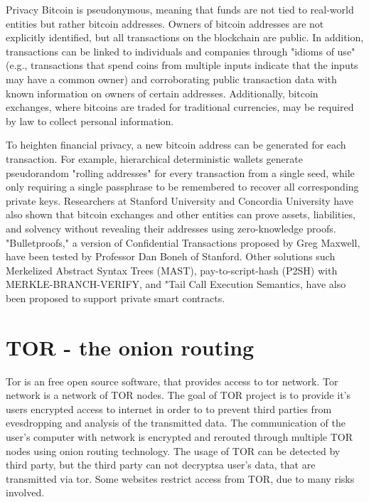 \documentclass[
  digital, %
  table,   %
  lof,     %
  lot,     %
  oneside
]{fithesis3}
\begin{document}
Privacy
Bitcoin is pseudonymous, meaning that funds are not tied to real-world entities but rather bitcoin addresses. Owners of bitcoin addresses are not explicitly identified, but all transactions on the blockchain are public. 
In addition, transactions can be linked to individuals and companies through "idioms of use" (e.g., transactions that spend coins from multiple inputs indicate that
the inputs may have a common owner) and corroborating public transaction data with known information on owners of certain addresses. Additionally, bitcoin exchanges, where bitcoins are traded for traditional
currencies, may be required by law to collect personal information.

To heighten financial privacy, a new bitcoin address can be generated for each transaction. For example, hierarchical deterministic wallets generate pseudorandom "rolling addresses"
for every transaction from a single seed, while only requiring a single passphrase to be remembered to recover all corresponding private keys. Researchers at Stanford University
and Concordia University have also shown that bitcoin exchanges and other entities can prove assets, liabilities, and solvency without revealing their addresses using zero-knowledge proofs.
"Bulletproofs," a version of Confidential Transactions proposed by Greg Maxwell, have been tested by Professor Dan Boneh of Stanford. Other solutions such Merkelized Abstract Syntax Trees (MAST),
pay-to-script-hash (P2SH) with MERKLE-BRANCH-VERIFY, and "Tail Call Execution Semantics, have also been proposed to support private smart contracts.


\section{TOR - the onion routing}

Tor is an free open source software, that provides access to tor network. Tor network is a network of TOR nodes.
The goal of TOR project is to provide it's users encrypted access to internet in order to to prevent third parties
from evesdropping and analysis of the transmitted data.
The communication of the user's computer with network is encrypted and rerouted through multiple TOR nodes using onion routing technology.
The usage of TOR can be detected by third party, but the third party can not decryptsa user's data, that are transmitted via tor.
Some websites restrict access from TOR, due to many risks involved.
\end{document}
